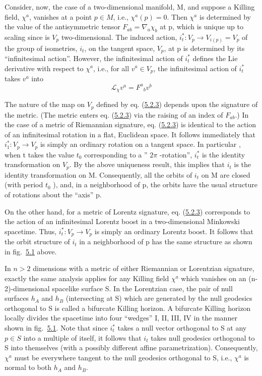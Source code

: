 \documentclass[11pt,a4paper]{article}
\begin{document}
Consider, now, the case of a two-dimensional manifold, M, and suppose a Killing field, \(\chi^a\), vanishes at a point \(p \in M\), i.e., \(\chi^a(p) = 0\). Then \(\chi^a\) is determined by the value of the antisymmetric tensor \(F_{ab} = \nabla_a \chi_b\) at p, which is unique up to scaling since is \(V_p\) two-dimensional. The induced action, \(i_t^*: V_p \rightarrow V_{i(p)} = V_p\) of the group of isometries, \(i_t\), on the tangent space, \(V_p\), at p is determined by its ``infinitesimal action''. However, the infinitesimal action of \(i_t^*\) defines the Lie derivative with respect to \(\chi^a\), i.e., for all \(v^a \in V_p\), the infinitesimal action of \(i_t^*\) takes \(v^a\) into
\begin{equation*}
\mathcal{L}_{\chi} v^{a} = F^{a}{}_{b} v^{b} \tag{5.2.3}\label{eq:5.2.3}
\end{equation*}

The nature of the map on \(V_p\) defined by eq. (\hyperref[eq:5.2.3]{5.2.3}) depends upon the signature of the metric. (The metric enters eq. (\hyperref[eq:5.2.3]{5.2.3}) via the raising of an index of \(F_{ab}\).) In the case of a metric of Riemannian signature, eq. (\hyperref[eq:5.2.3]{5.2.3}) is identical to the action of an infinitesimal rotation in a flat, Euclidean space. It follows immediately that \(i_1^*:V_p \rightarrow V_p\) is simply an ordinary rotation on a tangent space. In particular\hypertarget{source-133}{} , when t takes the value \(t_0\) corresponding to a '' \(2\pi\) -rotation'', \(i_t^*\) is the identity transformation on \(V_p\). By the above uniqueness result, this implies that \(i_t\) is the identity transformation on M. Consequently, all the orbits of \(i_t\) on M are closed (with period \(t_0\) ), and, in a neighborhood of p, the orbits have the usual structure of rotations about the ``axis'' p.

On the other hand, for a metric of Lorentz signature, eq. (\hyperref[eq:5.2.3]{5.2.3}) corresponds to the action of an infinitesimal Lorentz boost in a two-dimensional Minkowski spacetime. Thus, \(i_t^*: V_p \rightarrow V_p\) is simply an ordinary Lorentz boost. It follows that the orbit structure of \(i_t\) in a neighborhood of p has the same structure as shown in fig.~\hyperref[fig:5.1]{5.1} above.

In \(n>2\) dimensions with a metric of either Riemannian or Lorentzian signature, exactly the same analysis applies for any Killing field \(\chi^a\) which vanishes on an (n-2)-dimensional spacelike surface S. In the Lorentzian case, the pair of null surfaces \(h_A\) and \(h_B\) (intersecting at S) which are generated by the null geodesics orthogonal to S is called a bifurcate Killing horizon. A bifurcate Killing horizon locally divides the spacetime into four ``wedges'' I, II, III, IV in the manner shown in fig.~\hyperref[fig:5.1]{5.1}. Note that since \(i_t^*\) takes a null vector orthogonal to S at any \(p\in S\) into a multiple of itself, it follows that \(i_t\) takes null geodesics orthogonal to S into themselves (with a possibly different affine parametrization). Consequently, \(\chi^a\) must be everywhere tangent to the null geodesics orthogonal to S, i.e., \(\chi^a\) is normal to both \(h_A\) and \(h_B\).
\end{document}
